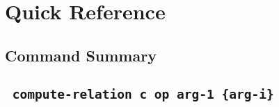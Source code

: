 \documentclass[headsepline]{scrreprt}
\theoremstyle{definition}
\newlength{\kastenbreite}
\newcommand{\kasten}[1]{\begin{minipage}
{.5\linewidth}
\setlength{\fboxrule}{0.4mm} \hspace{0.5cm}
\shadowbox{\parbox{\kastenbreite}{{\small #1}}}
\vspace{1mm}
\end{minipage}}
\begin{document}


\chapter{Quick Reference}

\section{Command Summary}
\section*{\texttt{ compute-relation c op arg-1 \{arg-i\}}}
\end{document}
